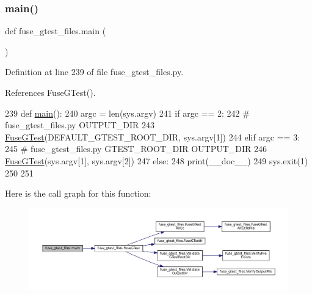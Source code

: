 \subsubsection{\texorpdfstring{main()}{main()}}
{\footnotesize\ttfamily def fuse\+\_\+gtest\+\_\+files.\+main (\begin{DoxyParamCaption}{ }\end{DoxyParamCaption})}



Definition at line 239 of file fuse\+\_\+gtest\+\_\+files.\+py.



References Fuse\+G\+Test().


\begin{DoxyCode}
239 \textcolor{keyword}{def }\hyperlink{namespacefuse__gtest__files_a5eaf924c10970f574e1b0459cbbda75a}{main}():
240   argc = len(sys.argv)
241   \textcolor{keywordflow}{if} argc == 2:
242     \textcolor{comment}{# fuse\_gtest\_files.py OUTPUT\_DIR}
243     \hyperlink{namespacefuse__gtest__files_a4e7007ceec3a7a25617eac3342563ed6}{FuseGTest}(DEFAULT\_GTEST\_ROOT\_DIR, sys.argv[1])
244   \textcolor{keywordflow}{elif} argc == 3:
245     \textcolor{comment}{# fuse\_gtest\_files.py GTEST\_ROOT\_DIR OUTPUT\_DIR}
246     \hyperlink{namespacefuse__gtest__files_a4e7007ceec3a7a25617eac3342563ed6}{FuseGTest}(sys.argv[1], sys.argv[2])
247   \textcolor{keywordflow}{else}:
248     print(\_\_doc\_\_)
249     sys.exit(1)
250 
251 
\end{DoxyCode}
Here is the call graph for this function\+:
\nopagebreak
\begin{figure}[H]
\begin{center}
\leavevmode
\includegraphics[width=350pt]{namespacefuse__gtest__files_a5eaf924c10970f574e1b0459cbbda75a_cgraph}
\end{center}
\end{figure}
\mbox{\label{namespacefuse__gtest__files_aa53690cd3c4ff01cfeea470f363f1dec}} 
